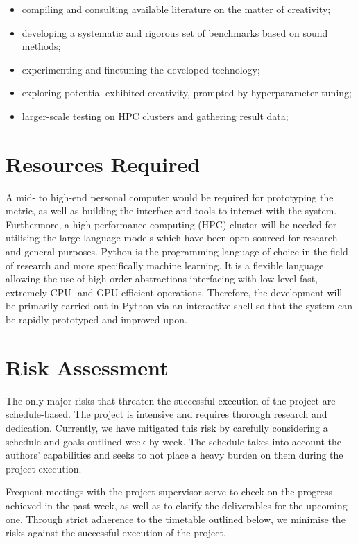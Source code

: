 \documentclass[a4paper,12pt]{article}
\begin{document}
\begin{itemize}
\item compiling and consulting available literature on the matter of creativity;
\item developing a systematic and rigorous set of benchmarks based on sound methods;
\item experimenting and finetuning the developed technology;
\item exploring potential exhibited creativity, prompted by hyperparameter tuning; 
\item larger-scale testing on HPC clusters and gathering result data;
\end{itemize}
%

\section*{Resources Required}
A mid- to high-end personal computer would be required for prototyping the metric, as well as building the interface and tools to interact with the system.  
Furthermore, a high-performance computing (HPC) cluster will be needed for utilising the large language models which have been open-sourced for research and general purposes. 
Python is the programming language of choice in the field of research and more specifically machine learning. It is a flexible language allowing the use of high-order abstractions interfacing with low-level fast, extremely CPU- and GPU-efficient operations. Therefore,  the development will be primarily carried out in Python via an interactive shell so that the system can be rapidly prototyped and improved upon. 

\section*{Risk Assessment}

The only major risks that threaten the successful execution of the project are schedule-based. The project is intensive and requires thorough research and dedication. Currently, we have mitigated this risk by carefully considering a schedule and goals outlined week by week. The schedule takes into account the authors' capabilities and seeks to not place a heavy burden on them during the project execution.

Frequent meetings with the project supervisor serve to check on the progress achieved in the past week, as well as to clarify the deliverables for the upcoming one. Through strict adherence to the timetable outlined below, we minimise the risks against the successful execution of the project.  
\end{document}
